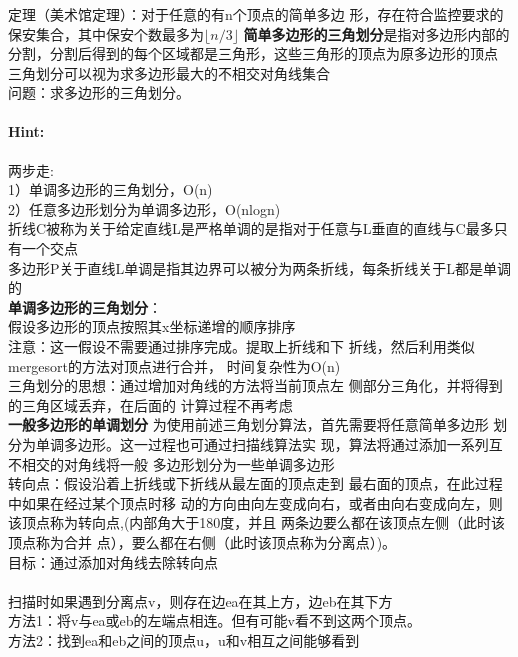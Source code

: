 \documentclass{article}
\begin{document}
     \subsubsection{}定理（美术馆定理）：对于任意的有n个顶点的简单多边
形，存在符合监控要求的保安集合，其中保安个数最多为$\lfloor n/3 \rfloor$
\textbf{简单多边形的三角划分}是指对多边形内部的分割，分割后得到的每个区域都是三角形，这些三角形的顶点为原多边形的顶点\\
三角划分可以视为求多边形最大的不相交对角线集合\\
问题：求多边形的三角划分。
     \paragraph{Hint:}两步走:\\
1）单调多边形的三角划分，O(n)\\
2）任意多边形划分为单调多边形，O(nlogn)\\
折线C被称为关于给定直线L是严格单调的是指对于任意与L垂直的直线与C最多只有一个交点\\
多边形P关于直线L单调是指其边界可以被分为两条折线，每条折线关于L都是单调的\\
\textbf{单调多边形的三角划分}：\\
假设多边形的顶点按照其x坐标递增的顺序排序\\
注意：这一假设不需要通过排序完成。提取上折线和下
折线，然后利用类似mergesort的方法对顶点进行合并，
时间复杂性为O(n)\\
三角划分的思想：通过增加对角线的方法将当前顶点左
侧部分三角化，并将得到的三角区域丢弃，在后面的
计算过程不再考虑\\

\textbf{一般多边形的单调划分}
为使用前述三角划分算法，首先需要将任意简单多边形
划分为单调多边形。这一过程也可通过扫描线算法实
现，算法将通过添加一系列互不相交的对角线将一般
多边形划分为一些单调多边形\\
转向点：假设沿着上折线或下折线从最左面的顶点走到
最右面的顶点，在此过程中如果在经过某个顶点时移
动的方向由向左变成向右，或者由向右变成向左，则
该顶点称为转向点,(内部角大于180度，并且
两条边要么都在该顶点左侧（此时该顶点称为合并
点），要么都在右侧（此时该顶点称为分离点）)。\\
目标：通过添加对角线去除转向点\\
\\
扫描时如果遇到分离点v，则存在边ea在其上方，边eb在其下方\\
方法1：将v与ea或eb的左端点相连。但有可能v看不到这两个顶点。\\
方法2：找到ea和eb之间的顶点u，u和v相互之间能够看到\\
     
\end{document}
